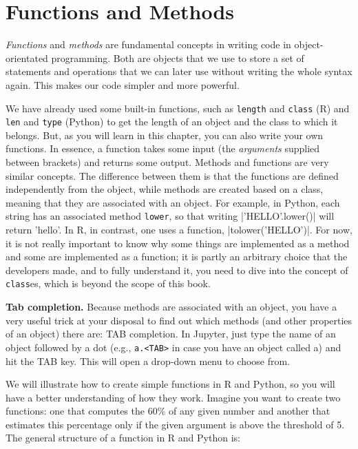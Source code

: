 
\section{Functions and Methods}
\label{sec:functions}

\emph{Functions} and \emph{methods} are fundamental concepts in
writing code in object-orientated programming. Both are objects that
we use to store a set of statements and operations that we can later
use without writing the whole syntax again. This makes our code
simpler and more powerful.

We have already used some built-in functions, such as \texttt{length} and
\texttt{class} (R) and \texttt{len} and \texttt{type} (Python) to get the length
of an object and the class to which it belongs. But, as you will learn
in this chapter, you can also write your own functions. In essence, a
function takes some input (the \emph{arguments} supplied between
brackets) and returns some output.  Methods and functions are very
similar concepts. The difference between them is that the functions
are defined independently from the object, while methods are created
based on a class, meaning that they are associated with an object. For
example, in Python, each string has an associated method \texttt{lower},
so that writing |'HELLO'.lower()| will return 'hello'. In R, in
contrast, one uses a function, |tolower('HELLO')|. For now, it is not
really important to know why some things are implemented as a method
and some are implemented as a function; it is partly an arbitrary
choice that the developers made, and to fully understand it, you need
to dive into the concept of \texttt{class}es, which is beyond the scope of
this book.


\begin{feature}\textbf{Tab completion.} Because methods are associated with an object, you have a very
  useful trick at your disposal to find out which methods (and other
  properties of an object) there are: TAB completion. In Jupyter, just
  type the name of an object followed by a dot (e.g., \texttt{a.<TAB>} in case you
  have an object called a) and hit the TAB key. This will open a
  drop-down menu to choose from.
\end{feature}

We will illustrate how to create simple functions in R and Python, so you
will have a better understanding of how they work. Imagine you want to
create two functions: one that computes the 60\% of any given number
and another that estimates this percentage only if the given argument
is above the threshold of 5.
The general structure of a function in R and Python is:

